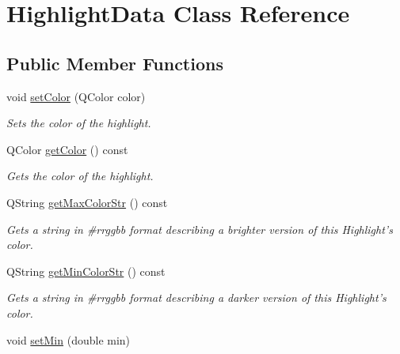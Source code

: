 \hypertarget{class_highlight_data}{\section{Highlight\-Data Class Reference}
\label{class_highlight_data}
}
\subsection*{Public Member Functions}
\begin{DoxyCompactItemize}
\item 
\hypertarget{class_highlight_data_acae12073d331d5cbe171cd8601e58afe}{void \hyperlink{class_highlight_data_acae12073d331d5cbe171cd8601e58afe}{set\-Color} (Q\-Color color)}\label{class_highlight_data_acae12073d331d5cbe171cd8601e58afe}

\begin{DoxyCompactList}\small\item\em Sets the color of the highlight. \end{DoxyCompactList}\item 
\hypertarget{class_highlight_data_a7af5a3ba0b92f32ab23ac97ab7e9dd8f}{Q\-Color \hyperlink{class_highlight_data_a7af5a3ba0b92f32ab23ac97ab7e9dd8f}{get\-Color} () const }\label{class_highlight_data_a7af5a3ba0b92f32ab23ac97ab7e9dd8f}

\begin{DoxyCompactList}\small\item\em Gets the color of the highlight. \end{DoxyCompactList}\item 
\hypertarget{class_highlight_data_a5fad79aa41c5d56b08cc6f463f58039e}{Q\-String \hyperlink{class_highlight_data_a5fad79aa41c5d56b08cc6f463f58039e}{get\-Max\-Color\-Str} () const }\label{class_highlight_data_a5fad79aa41c5d56b08cc6f463f58039e}

\begin{DoxyCompactList}\small\item\em Gets a string in \#rrggbb format describing a brighter version of this Highlight's color. \end{DoxyCompactList}\item 
\hypertarget{class_highlight_data_af502beb53c3d5ab551bf3b931dd9b5cb}{Q\-String \hyperlink{class_highlight_data_af502beb53c3d5ab551bf3b931dd9b5cb}{get\-Min\-Color\-Str} () const }\label{class_highlight_data_af502beb53c3d5ab551bf3b931dd9b5cb}

\begin{DoxyCompactList}\small\item\em Gets a string in \#rrggbb format describing a darker version of this Highlight's color. \end{DoxyCompactList}\item 
\hypertarget{class_highlight_data_a02799bee4dbe5327b54726193aefb795}{void \hyperlink{class_highlight_data_a02799bee4dbe5327b54726193aefb795}{set\-Min} (double min)}\label{class_highlight_data_a02799bee4dbe5327b54726193aefb795}


\end{DoxyCompactItemize}

